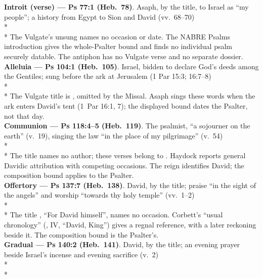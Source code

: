 \begin{passagedossiertable}
\textbf{Introit (verse) --- Ps 77:1 (Heb.\ 78)}. Asaph, by the title, to Israel as ``my
people''; a history from Egypt to Sion and David (vv.~68--70)\\*
\\*
The Vulgate's unsung  names no occasion or date. The NABRE Psalms introduction gives the whole-Psalter bound and finds no individual psalm securely datable. The antiphon has no Vulgate verse and no separate dossier.\\
\midrule
\textbf{Alleluia --- Ps 104:1 (Heb.\ 105)}. Israel, bidden to declare God's deeds among
the Gentiles; sung before the ark at Jerusalem (1 Par 15:3; 16:7--8)\\*
\\*
The Vulgate title is , omitted by the Missal. Asaph sings these words when the ark enters David's tent (1~Par 16:1, 7); the displayed bound dates the Psalter, not that day.\\
\midrule
\textbf{Communion --- Ps 118:4--5 (Heb.\ 119)}. The psalmist, ``a sojourner on the
earth'' (v.~19), singing the law ``in the place of my pilgrimage'' (v.~54)\\*
\\*
The title  names no author; these verses belong to . Haydock reports general Davidic attribution with competing occasions. The reign identifies David; the composition bound applies to the Psalter.\\
\midrule
\textbf{Offertory --- Ps 137:7 (Heb.\ 138)}. David, by the title; praise ``in the sight
of the angels'' and worship ``towards thy holy temple'' (vv.~1--2)\\*
\\*
The title , ``For David himself'', names no occasion. Corbett's ``usual chronology'' (, IV, ``David, King'') gives a regnal reference, with a later reckoning beside it. The composition bound is the Psalter's.\\
\midrule
\textbf{Gradual --- Ps 140:2 (Heb.\ 141)}. David, by the title; an evening prayer beside
Israel's incense and evening sacrifice (v.~2)\\*
\\*

\end{passagedossiertable}
